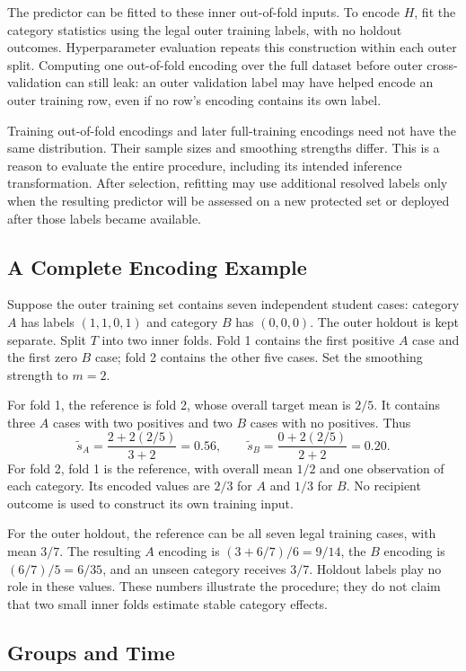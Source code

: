 The predictor can be fitted to these inner out-of-fold inputs. To encode $H$, fit the category statistics using the legal outer training labels, with no holdout outcomes. Hyperparameter evaluation repeats this construction within each outer split. Computing one out-of-fold encoding over the full dataset before outer cross-validation can still leak: an outer validation label may have helped encode an outer training row, even if no row's encoding contains its own label.

Training out-of-fold encodings and later full-training encodings need not have the same distribution. Their sample sizes and smoothing strengths differ. This is a reason to evaluate the entire procedure, including its intended inference transformation. After selection, refitting may use additional resolved labels only when the resulting predictor will be assessed on a new protected set or deployed after those labels became available.

\subsection{A Complete Encoding Example}

Suppose the outer training set contains seven independent student cases: category $A$ has labels $(1,1,0,1)$ and category $B$ has $(0,0,0)$. The outer holdout is kept separate. Split $T$ into two inner folds. Fold 1 contains the first positive $A$ case and the first zero $B$ case; fold 2 contains the other five cases. Set the smoothing strength to $m=2$.

For fold 1, the reference is fold 2, whose overall target mean is $2/5$. It contains three $A$ cases with two positives and two $B$ cases with no positives. Thus
\[
\widetilde s_A=\frac{2+2(2/5)}{3+2}=0.56,
\qquad
\widetilde s_B=\frac{0+2(2/5)}{2+2}=0.20.
\]
For fold 2, fold 1 is the reference, with overall mean $1/2$ and one observation of each category. Its encoded values are $2/3$ for $A$ and $1/3$ for $B$. No recipient outcome is used to construct its own training input.

For the outer holdout, the reference can be all seven legal training cases, with mean $3/7$. The resulting $A$ encoding is $(3+6/7)/6=9/14$, the $B$ encoding is $(6/7)/5=6/35$, and an unseen category receives $3/7$. Holdout labels play no role in these values. These numbers illustrate the procedure; they do not claim that two small inner folds estimate stable category effects.

\subsection{Groups and Time}

